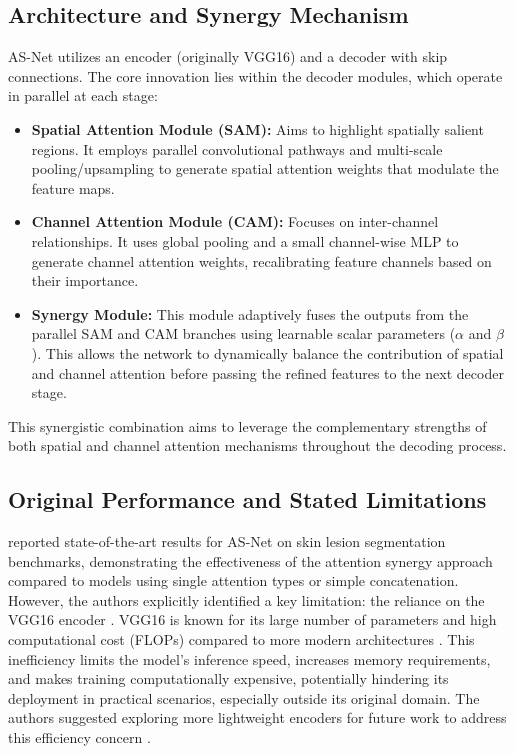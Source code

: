 \subsection{Architecture and Synergy Mechanism}
AS-Net utilizes an encoder (originally VGG16) and a decoder with skip connections. The core innovation lies within the decoder modules, which operate in parallel at each stage:
\begin{itemize}
  \item \textbf{Spatial Attention Module (SAM):} Aims to highlight spatially salient regions. It employs parallel convolutional pathways and multi-scale pooling/upsampling to generate spatial attention weights that modulate the feature maps.
  \item \textbf{Channel Attention Module (CAM):} Focuses on inter-channel relationships. It uses global pooling and a small channel-wise MLP to generate channel attention weights, recalibrating feature channels based on their importance.
  \item \textbf{Synergy Module:} This module adaptively fuses the outputs from the parallel SAM and CAM branches using learnable scalar parameters ($\alpha$ and $\beta$). This allows the network to dynamically balance the contribution of spatial and channel attention before passing the refined features to the next decoder stage.
\end{itemize}
This synergistic combination aims to leverage the complementary strengths of both spatial and channel attention mechanisms throughout the decoding process.

\subsection{Original Performance and Stated Limitations}
\textcite{hu2022asnet} reported state-of-the-art results for AS-Net on skin lesion segmentation benchmarks, demonstrating the effectiveness of the attention synergy approach compared to models using single attention types or simple concatenation. However, the authors explicitly identified a key limitation: the reliance on the VGG16 encoder \parencite{hu2022asnet}. VGG16 is known for its large number of parameters and high computational cost (FLOPs) compared to more modern architectures \parencite{canziani2016analysis}. This inefficiency limits the model's inference speed, increases memory requirements, and makes training computationally expensive, potentially hindering its deployment in practical scenarios, especially outside its original domain. The authors suggested exploring more lightweight encoders for future work to address this efficiency concern \parencite{hu2022asnet}.

